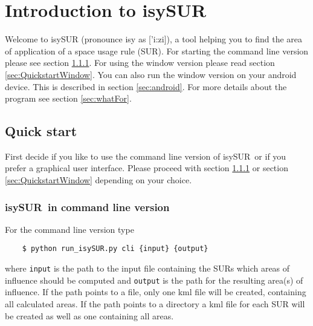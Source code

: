 \documentclass[11pt,fleqn]{book} %
\newcommand{\ProjectTitle}{isySUR}
\newcommand{\pt}{\ProjectTitle}
\begin{document}

\pagestyle{empty} %

\setcounter{tocdepth}{3}
\tableofcontents %

\cleardoublepage %

\pagestyle{fancy} %


\chapter{Introduction to \ProjectTitle}
Welcome to isySUR (pronounce isy as ['i:zi]), a tool helping you to find the area of application of a space usage rule (SUR). For starting the command line version please see section \ref{sec:QuickstartTerminal}. For using the window version please read section \ref{sec:QuickstartWindow}. You can also run the window version on your android device. This is described in section \ref{sec:android}. For more details about the program see section \ref{sec:whatFor}.

\section{Quick start}
First decide if you like to use the command line version of \pt\ or if you prefer a graphical user interface. Please proceed with section \ref{sec:QuickstartTerminal} or section \ref{sec:QuickstartWindow} depending on your choice.

\subsection{\ProjectTitle\ in command line version}\label{sec:QuickstartTerminal}
For the command line version type
\begin{verbatim}
	$ python run_isySUR.py cli {input} {output}
\end{verbatim}
where \texttt{input} is the path to the input file containing the SURs which areas of influence should be computed and \texttt{output} is the path for the resulting area(s) of influence. If the path points to a file, only one kml file will be created, containing all calculated areas. If the path points to a directory a kml file for each SUR will be created as well as one containing all areas.
\end{document}
